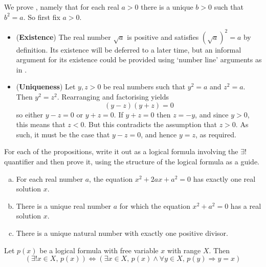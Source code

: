\begin{example}
\label{exEveryPositiveRealHasUniqueSquareRootProof}
We prove , namely that for each real $a>0$ there is a unique $b>0$ such that $b^2=a$. So first fix $a > 0$.
\begin{itemize}
\item (\textbf{Existence}) The real number $\sqrt{a}$ is positive and satisfies $(\sqrt{a})^2=a$ by definition. Its existence will be deferred to a later time, but an informal argument for its existence could be provided using `number line' arguments as in .
\item (\textbf{Uniqueness}) Let $y,z > 0$ be real numbers such that $y^2=a$ and $z^2=a$. Then $y^2=z^2$. Rearranging and factorising yields
\[(y-z)(y+z)=0\]
so either $y-z=0$ or $y+z=0$. If $y+z=0$ then $z=-y$, and since $y>0$, this means that $z<0$. But this contradicts the assumption that $z>0$. As such, it must be the case that $y-z=0$, and hence $y=z$, as required.
\end{itemize}
\end{example}

\begin{exercise}
\label{exExamplesOfUniqueExistentialQuantifier}
For each of the propositions, write it out as a logical formula involving the $\exists !$ quantifier and then prove it, using the structure of the logical formula as a guide.
\begin{enumerate}[(a)]
\item For each real number $a$, the equation $x^2+2ax+a^2=0$ has exactly one real solution $x$.
\item There is a unique real number $a$ for which the equation $x^2+a^2=0$ has a real solution $x$.
\item There is a unique natural number with exactly one positive divisor.
\end{enumerate}
\end{exercise}

\begin{proposition}
\label{propAlternativeCharUniqueExists}
Let $p(x)$ be a logical formula with free variable $x$ with range $X$. Then
\[(\exists ! x \in X,\, p(x)) \Leftrightarrow (\exists x \in X,\, p(x) \wedge \forall y \in X,\, p(y) \Rightarrow y = x)\]
\end{proposition}

